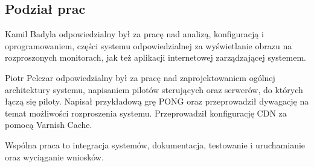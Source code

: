 \subsection{Podział prac}

Kamil Badyla odpowiedzialny był za pracę nad analizą, konfiguracją i oprogramowaniem, części systemu odpowiedzialnej za wyświetlanie obrazu na rozproszonych monitorach, jak też aplikacji internetowej zarządzającej systemem.

Piotr Pelczar odpowiedzialny był za pracę nad zaprojektowaniem ogólnej architektury systemu, napisaniem pilotów sterujących oraz serwerów, do których łączą się piloty. Napisał przykładową grę PONG oraz przeprowadził dywagację na temat możliwości rozproszenia systemu. Przeprowadził konfigurację CDN za pomocą Varnish Cache.

Wspólna praca to integracja systemów, dokumentacja, testowanie i uruchamianie oraz wyciąganie wniosków.
